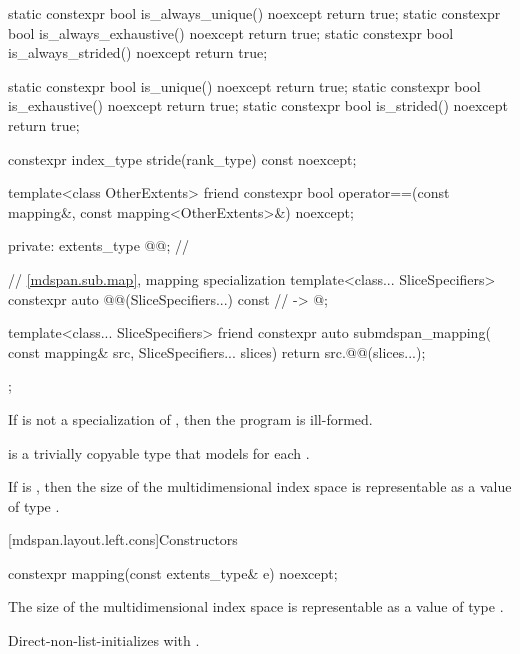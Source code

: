 \begin{codeblock}
{{    static constexpr bool is_always_unique() noexcept { return true; }
    static constexpr bool is_always_exhaustive() noexcept { return true; }
    static constexpr bool is_always_strided() noexcept { return true; }

    static constexpr bool is_unique() noexcept { return true; }
    static constexpr bool is_exhaustive() noexcept { return true; }
    static constexpr bool is_strided() noexcept { return true; }

    constexpr index_type stride(rank_type) const noexcept;

    template<class OtherExtents>
      friend constexpr bool operator==(const mapping&, const mapping<OtherExtents>&) noexcept;

  private:
    extents_type @@{};                                               // \expos

    // \ref{mdspan.sub.map},  mapping specialization
    template<class... SliceSpecifiers>
      constexpr auto @@(SliceSpecifiers...) const     // \expos
        -> @\seebelow@;

    template<class... SliceSpecifiers>
      friend constexpr auto submdspan_mapping(
        const mapping& src, SliceSpecifiers... slices) {
          return src.@@(slices...);
      }
  };
}
\end{codeblock}

\pnum
If  is not a specialization of ,
then the program is ill-formed.

\pnum
{} is a trivially copyable type
that models  for each .

\pnum
\mandates
If  is ,
then the size of the multidimensional index space 
is representable as a value of type .

[mdspan.layout.left.cons]{Constructors}

%
\begin{itemdecl}
constexpr mapping(const extents_type& e) noexcept;
\end{itemdecl}

\begin{itemdescr}
\pnum
\expects
The size of the multidimensional index space 
is representable as a value of type .

\pnum
\effects
Direct-non-list-initializes  with .
\end{itemdescr}

